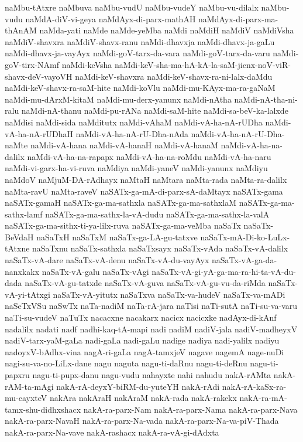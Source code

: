 {naMbu-tAtxre
naMbuva
naMbu-vudU
naMbu-vudeY
naMbu-vu-dilalx
naMbu-vudu
naMdA-diV-vi-geya
naMdAyx-di-parx-mathAH
naMdAyx-di-parx-ma-thAnAM
naMda-yati
naMde
naMde-yeMba
naMdi
naMdiH
naMdiV
naMdiVsha
naMdiV-shavxra
naMdiV-shavx-ranu
naMdi-dhavxja
naMdi-dhavx-ja-gaLu
naMdi-dhavx-ja-vayAyx
naMdi-goV-tarx-da-vara
naMdi-goV-tarx-da-varu
naMdi-goV-tirx-NAmf
naMdi-keVsha
naMdi-keV-sha-ma-hA-kA-la-saM-jicnx-noV-viR-shavx-deV-vayoVH
naMdi-keV-shavxra
naMdi-keV-shavx-ra-ni-lalx-daMdu
naMdi-keV-shavx-ra-saM-hite
naMdi-koVlu
naMdi-mu-KAyx-ma-ra-gaNaM
naMdi-mu-dArxM-kitaM
naMdi-mu-derx-yanunx
naMdi-nAtha
naMdi-nA-tha-ni-ralu
naMdi-nA-thanu
naMdi-pu-rANa
naMdi-saM-hite
naMdi-sa-beV-ka-lalxde
naMdisi
naMdi-sida
naMditutx
naMdi-vAhaM
naMdi-vA-ha-nA-rUDha
naMdi-vA-ha-nA-rUDhaH
naMdi-vA-ha-nA-rU-Dha-nAda
naMdi-vA-ha-nA-rU-Dha-naMte
naMdi-vA-hana
naMdi-vA-hanaH
naMdi-vA-hanaM
naMdi-vA-ha-na-dalilx
naMdi-vA-ha-na-rapapx
naMdi-vA-ha-na-roMdu
naMdi-vA-ha-naru
naMdi-vi-garx-ha-vi-ruva
naMdiya
naMdi-yaneV
naMdi-yanunx
naMdiyu
naMdoV
naMjuM-DA-rAdhayx
naMtaH
naMtara
naMta-rada
naMta-ra-dalilx
naMta-ravU
naMta-raveV
naSATx-ga-mA-di-parx-sA-daMtayx
naSATx-gama
naSATx-gamaH
naSATx-ga-ma-sathxla
naSATx-ga-ma-sathxlaM
naSATx-ga-ma-sathx-lamf
naSATx-ga-ma-sathx-la-vA-dudu
naSATx-ga-ma-sathx-la-valA
naSATx-ga-ma-sithx-ti-ya-lilx-ruva
naSATx-ga-ma-veMba
naSaTx
naSaTx-BeVdaH
naSaTxH
naSaTxM
naSaTx-ga-LA-gu-tatxve
naSaTx-mA-Di-ko-LuLx-tAtxne
naSaTxnu
naSaTx-sathxla
naSaTxsayx
naSaTx-vAda
naSaTx-vA-dalilx
naSaTx-vA-dare
naSaTx-vA-denu
naSaTx-vA-du-vayAyx
naSaTx-vA-ga-da-nanxkakx
naSaTx-vA-galu
naSaTx-vAgi
naSaTx-vA-gi-yA-ga-ma-ra-hi-ta-vA-du-dada
naSaTx-vA-gu-tatxde
naSaTx-vA-guva
naSaTx-vA-gu-vu-da-riMda
naSaTx-vA-yi-tAtxgi
naSaTx-vA-yitutx
naSaTxva
naSaTx-va-hudeV
naSaTx-va-mADi
naSeTxVSu
naSwTx
naTa-nadiM
naTa-rA-jara
naTisi
naTi-sutA
naTi-su-va-varu
naTi-su-vudeV
naTuTx
nacacxne
nacakarx
nacicx
nacicxke
nadAyx-di-kAnf
nadalilx
nadati
nadf
nadhi-kaq-tA-mapi
nadi
nadiM
nadiV-jala
nadiV-madheyxV
nadiV-tarx-yaM-gaLa
nadi-gaLa
nadi-gaLu
nadige
nadiya
nadi-yalilx
nadiyu
nadoyxV-bAdhx-vina
nagA-ri-gaLa
nagA-tamxjeV
nagave
nagemA
nage-nuDi
nagi-su-va-no-LiLx-dane
nagu
naguta
nagu-ti-daRnu
nagu-ti-deRnu
nagu-ti-papxru
nagu-ti-pupx-danu
nagu-vudu
nahayxte
nahi
nahudu
nakA-rAMta
nakA-rAM-ta-mAgi
nakA-rA-deyxY-biRM-du-yuteYH
nakA-rAdi
nakA-rA-kaSx-ra-mu-cayxteV
nakAra
nakAraH
nakAraM
nakA-rada
nakA-rakekx
nakA-ra-mA-tamx-shu-didhxshacx
nakA-ra-parx-Nam
nakA-ra-parx-Nama
nakA-ra-parx-Nava
nakA-ra-parx-NavaH
nakA-ra-parx-Na-vada
nakA-ra-parx-Na-va-piV-Thada
nakA-ra-parx-Na-vave
nakA-rashacx
nakA-ra-vA-gi-dAdxta
}
